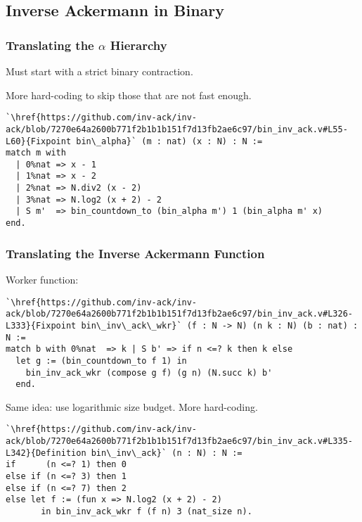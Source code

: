 \subsection{Inverse Ackermann in Binary}

\begin{frame}[fragile]
\frametitle{Translating the $\alpha$ Hierarchy}

Must start with a strict binary contraction.

\smallskip

More hard-coding to skip those that are not fast enough.

\bigskip

\pause 
\begin{lstlisting}
`\href{https://github.com/inv-ack/inv-ack/blob/7270e64a2600b771f2b1b1b151f7d13fb2ae6c97/bin_inv_ack.v#L55-L60}{Fixpoint bin\_alpha}` (m : nat) (x : N) : N :=
match m with
  | 0%nat => x - 1          
  | 1%nat => x - 2
  | 2%nat => N.div2 (x - 2) 
  | 3%nat => N.log2 (x + 2) - 2
  | S m'  => bin_countdown_to (bin_alpha m') 1 (bin_alpha m' x)
end.
\end{lstlisting}

\end{frame}


\begin{frame}[fragile]
\frametitle{Translating the Inverse Ackermann Function}

Worker function:

\begin{lstlisting}
`\href{https://github.com/inv-ack/inv-ack/blob/7270e64a2600b771f2b1b1b151f7d13fb2ae6c97/bin_inv_ack.v#L326-L333}{Fixpoint bin\_inv\_ack\_wkr}` (f : N -> N) (n k : N) (b : nat) : N :=
match b with 0%nat  => k | S b' => if n <=? k then k else
  let g := (bin_countdown_to f 1) in
    bin_inv_ack_wkr (compose g f) (g n) (N.succ k) b'
  end.
\end{lstlisting}

\pause 
Same idea: use logarithmic size budget. More hard-coding.

\pause 
\begin{lstlisting}
`\href{https://github.com/inv-ack/inv-ack/blob/7270e64a2600b771f2b1b1b151f7d13fb2ae6c97/bin_inv_ack.v#L335-L342}{Definition bin\_inv\_ack}` (n : N) : N :=
if      (n <=? 1) then 0
else if (n <=? 3) then 1
else if (n <=? 7) then 2
else let f := (fun x => N.log2 (x + 2) - 2)
       in bin_inv_ack_wkr f (f n) 3 (nat_size n).
\end{lstlisting}

\end{frame}


